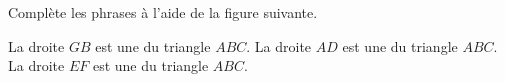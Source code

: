 %
%
    Complète les phrases à l'aide de la figure suivante.
    \begin{center}
        
    \end{center}
    \begin{tasks}
        \task La droite $GB$ est une \dotfill du triangle $ABC$.
        \task La droite $AD$ est une \dotfill du triangle $ABC$.
        \task La droite $EF$ est une \dotfill du triangle $ABC$.
    \end{tasks}
